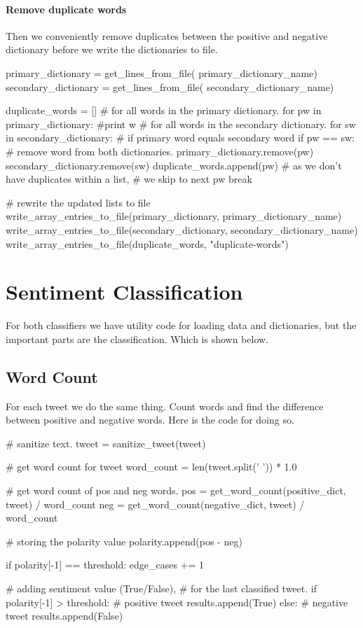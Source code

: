 \paragraph{Remove duplicate words}\label{code:remove_duplicate_words}
Then we conveniently remove duplicates between the positive and negative
dictionary before we write the dictionaries to file. 
\begin{python}
primary_dictionary = get_lines_from_file(
    primary_dictionary_name)
secondary_dictionary = get_lines_from_file(
    secondary_dictionary_name)

duplicate_words = []
# for all words in the primary dictionary.
for pw in primary_dictionary:
    #print w
    # for all words in the secondary dictionary.
    for sw in secondary_dictionary:
        # if primary word equals secondary word
        if pw == sw:
            # remove word from both dictionaries.
            primary_dictionary.remove(pw)
            secondary_dictionary.remove(sw)
            duplicate_words.append(pw)
            # as we don't have duplicates within a list,
            # we skip to next pw
            break

# rewrite the updated lists to file
write_array_entries_to_file(primary_dictionary, 
                            primary_dictionary_name)
write_array_entries_to_file(secondary_dictionary, 
                            secondary_dictionary_name)
write_array_entries_to_file(duplicate_words, 
                            "duplicate-words")
\end{python}
%

\section{Sentiment Classification}\label{code:sentiment_classification}
For both classifiers we have utility code for loading data and dictionaries,
but the important parts are the classification. Which is shown below. 

\subsection{Word Count}\label{code:word_count_classification}
For each tweet we do the same thing. Count words and find the difference
between positive and negative words. Here is the code for doing so.   
\begin{python}
# sanitize text.
tweet = sanitize_tweet(tweet)

# get word count for tweet
word_count = len(tweet.split(' ')) * 1.0

# get word count of pos and neg words.
pos = get_word_count(positive_dict, tweet) / word_count
neg = get_word_count(negative_dict, tweet) / word_count

# storing the polarity value
polarity.append(pos - neg)

if polarity[-1] == threshold:
    edge_cases += 1

# adding sentiment value (True/False), 
# for the last classified tweet.
if polarity[-1] > threshold:
    # positive tweet
    results.append(True)
else:
    # negative tweet
    results.append(False)
\end{python}

